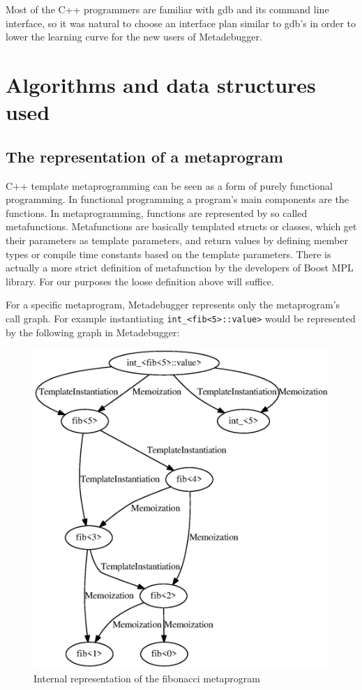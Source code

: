 Most of the C++ programmers are familiar with gdb\cite{gdb} and its command
line interface, so it was natural to choose an interface plan similar to gdb's
in order to lower the learning curve for the new users of Metadebugger.

\section{Algorithms and data structures used}

\subsection{The representation of a metaprogram}

C++ template metaprogramming can be seen as a form of purely functional
programming\cite{mihalicza-phd}. In functional programming a program's main
components are the functions. In metaprogramming, functions are represented by
so called metafunctions. Metafunctions are basically templated structs or
classes, which get their parameters as template parameters, and return values
by defining member types or compile time constants based on the template
parameters. There is actually a more strict
definition\cite{boost-mpl-metafunction} of metafunction by the developers of
Boost MPL library\cite{boost-mpl}. For our purposes the loose definition above
will suffice.

For a specific metaprogram, Metadebugger represents only the metaprogram's call
graph. For example instantiating \texttt{int\_<fib<5>::value>} would be
represented by the following graph in Metadebugger:

\begin{figure}[H]
    \includegraphics[width=\textwidth]{img/fib5_call_graph.eps}
    \caption{Internal representation of the fibonacci metaprogram}
\end{figure}

